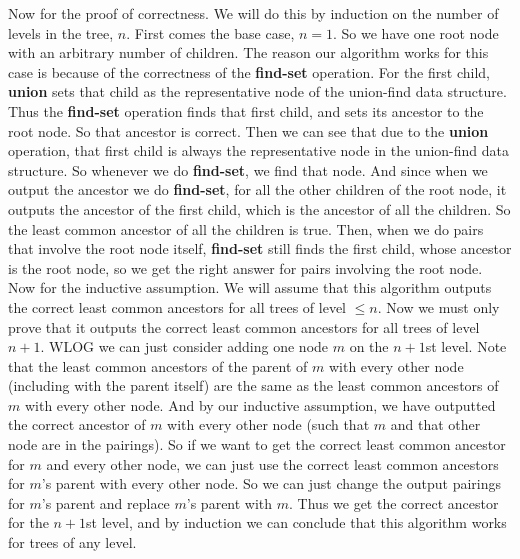 \documentclass{article}
\begin{document}
Now for the proof of correctness. We will do this by induction on the number of
levels in the tree, $n$. First comes the base case, $n=1$. So we have one root
node with an arbitrary number of children. The reason our algorithm works for
this case is because of the correctness of the \textbf{find-set} operation. For
the first child, \textbf{union} sets that child as the representative node of
the union-find data structure. Thus the
\textbf{find-set} operation finds that first child, and sets its ancestor to the
root node. So that ancestor is correct. Then we can see that due to the
\textbf{union} operation, that first child is always the representative node in the
union-find data structure. So whenever we do \textbf{find-set}, we find that
node. And since when we output the ancestor we do \textbf{find-set}, for all the
other children of the root node, it outputs the ancestor of the first child,
which is the ancestor of all the children. So the least common ancestor of all
the children is true. Then, when we do pairs that involve the root node itself,
\textbf{find-set} still finds the first child, whose ancestor is the root node,
so we get the right answer for pairs involving the root node. Now for the
inductive assumption. We will assume that this algorithm outputs the correct
least common ancestors for all trees of level $\leq n$. Now we must only prove
that it outputs the correct least common ancestors for all trees of level $n+1$.
WLOG we can just consider adding one node $m$ on the $n+1$st level. Note that the
least common ancestors of the parent of $m$ with every other node
(including with the parent itself) are the same as the least common ancestors of
$m$ with every other node. And by our inductive assumption, we have outputted
the correct ancestor of $m$ with every other node (such that $m$ and that other
node are in the pairings). So if we want to get the correct least common
ancestor for $m$ and every other node, we can just use the correct least common
ancestors for $m$'s parent with every other node. So we can just change the
output pairings for $m$'s parent and replace $m$'s parent with $m$. Thus we get
the correct ancestor for the $n+1$st level, and by induction we can conclude
that this algorithm works for trees of any level.
\newpage
\end{document}
